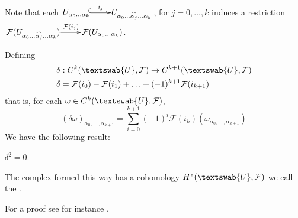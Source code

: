 
Note that each $\xymatrix@1{ U_{\alpha_0\ldots\alpha_k}\ar@{^{(}->}[r]^-{i_j} & U_{\alpha_0\ldots\widehat{\alpha_j}\ldots\alpha_k}}$, for $j=0,\ldots,k$ induces a restriction $\xymatrix@1{\mathcal{F}(U_{\alpha_0\ldots\widehat{\alpha_j}\ldots\alpha_k})\ar[r]^-{\mathcal{F}(i_j)}  & \mathcal{F}(U_{\alpha_0\ldots\alpha_k})}$.

Defining \begin{align*}
\delta&:C^k(\textswab{U},\mathcal{F})\rightarrow C^{k+1}(\textswab{U},\mathcal{F}) \\
\delta&=\mathcal{F}(i_0)-\mathcal{F}(i_1)+\ldots+(-1)^{k+1}\mathcal{F}(i_{k+1})
\end{align*}
that is, for each $\omega\in C^k(\textswab{U},\mathcal{F})$,
\begin{equation*}
(\delta \omega)_{\alpha_0,\ldots,\alpha_{k+1}}=\sum_{i=0}^{k+1}(-1)^i \mathcal{F}(i_k)(\omega_{\alpha_0,\ldots,\alpha_{k+1}})
\end{equation*}
We have the following result:
\begin{prop}
$\delta^2=0$.
\end{prop}
\begin{definition}
The complex formed this way has a cohomology $H^*(\textswab{U},\mathcal{F})$ we call the . 
\end{definition}
For a proof see for instance \cite[p. 110]{bott}.

